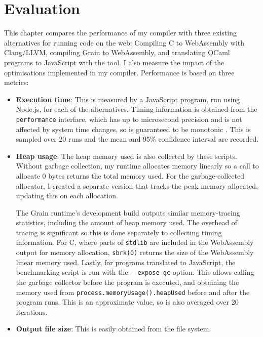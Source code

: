 \chapter{Evaluation}
This chapter compares the performance of my compiler with three existing alternatives for running code on the web: Compiling C to WebAssembly with Clang/LLVM, compiling Grain to WebAssembly, and translating OCaml programs to JavaScript with the \jsofocaml{} tool.
I also measure the impact of the optimisations implemented in my compiler. Performance is based on three metrics: 

\begin{itemize}
\item \textbf{Execution time}: This is measured by a JavaScript program, run using Node.js, for each of the alternatives. Timing information is obtained from the \verb|performance| interface, which has up to microsecond precision and is not affected by system time changes, so is guaranteed to be monotonic \cite{timing}. This is sampled over 20 runs and the mean and 95\% confidence interval are recorded. 

\item \textbf{Heap usage}: The heap memory used is also collected by these scripts. Without garbage collection, my runtime allocates memory linearly so a call to allocate 0 bytes returns the total memory used. For the garbage-collected allocator, I created a separate version that tracks the peak memory allocated, updating this on each allocation. 

The Grain runtime's development build outputs similar memory-tracing statistics, including the amount of heap memory used. 
The overhead of tracing is significant so this is done separately to collecting timing information. For C, where parts of \verb|stdlib| are included in the WebAssembly output for memory allocation, \verb|sbrk(0)| returns the size of the WebAssembly linear memory used. %
Lastly, for programs translated to JavaScript, the benchmarking script is run with the \verb|--expose-gc| option. This allows calling the garbage collector before the program is executed, and obtaining the memory used from \verb|process.memoryUsage().heapUsed| before and after the program runs. This is an approximate value, so is also averaged over 20 iterations.

\item \textbf{Output file size}: This is easily obtained from the file system.

\end{itemize}

